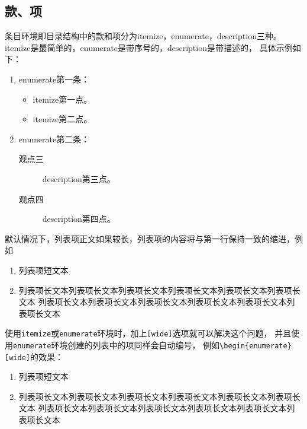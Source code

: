 			\subsection{款、项}
			\label{subsec-item}
			条目环境即目录结构中的款和项分为itemize，enumerate，description三种。
			itemize是最简单的，enumerate是带序号的，description是带描述的，
			具体示例如下：
			
			\begin{enumerate}
				\item enumerate第一条：
				\begin{itemize}
					\item itemize第一点。
					\item itemize第二点。
				\end{itemize}
				\item enumerate第二条：
				\begin{description}
					\item[观点三] description第三点。
					\item[观点四] description第四点。
				\end{description}
			\end{enumerate}
			
			默认情况下，列表项正文如果较长，列表项的内容将与第一行保持一致的缩进，例如
			
			\begin{enumerate}
				\item 列表项短文本
				\item 列表项长文本列表项长文本列表项长文本列表项长文本列表项长文本列表项长文本
				列表项长文本列表项长文本列表项长文本列表项长文本列表项长文本列表项长文本
			\end{enumerate}
			
			使用\verb|itemize|或\verb|enumerate|环境时，加上\verb|[wide]|选项就可以解决这个问题，
			并且使用\verb|enumerate|环境创建的列表中的项同样会自动编号，
			例如\verb|\begin{enumerate}[wide]|的效果：
				
				\begin{enumerate}[wide]
					\item 列表项短文本
					\item 列表项长文本列表项长文本列表项长文本列表项长文本列表项长文本列表项长文本
					列表项长文本列表项长文本列表项长文本列表项长文本列表项长文本列表项长文本
				\end{enumerate}
				
